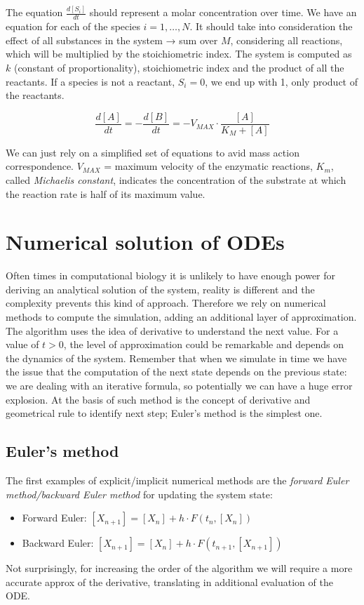 \noindent
The equation $\frac{d[S_i]}{dt}$ should represent a molar concentration over time.
We have an equation for each of the species $i=1,…,N$.
It should take into consideration the effect of all substances in the system → sum over $M$, considering all reactions, which will be multiplied by the stoichiometric index.
The system is computed as $k$ (constant of proportionality), stoichiometric index and the product of all the reactants.
If a species is not a reactant, $S_i=0$, we end up with 1, only product of the reactants.

$$\frac{d[A]}{dt}= - \frac{d[B]}{dt}= -V_{MAX}\cdot \frac{[A]}{K_M+[A]}$$

\noindent
We can just rely on a simplified set of equations to avid mass action correspondence.
$V_{MAX}$ = maximum velocity of the enzymatic reactions, $K_m$, called \emph{Michaelis constant}, indicates the concentration of the substrate at which the reaction rate is half of its maximum value.

\section{Numerical solution of ODEs}
Often times in computational biology it is unlikely to have enough power for deriving an analytical solution of the system, reality is different and the complexity prevents this kind of approach.
Therefore we rely on numerical methods to compute the simulation, adding an additional layer of approximation.
The algorithm uses the idea of derivative to understand the next value.
For a value of $t>0$, the level of approximation could be remarkable and depends on the dynamics of the system.
Remember that when we simulate in time we have the issue that the computation of the next state depends on the previous state: we are dealing with an iterative formula, so potentially we can have a huge error explosion.
At the basis of such method is the concept of derivative and geometrical rule to identify next step; Euler's method is the simplest one.

  \subsection{Euler's method}
  The first examples of explicit/implicit numerical methods are the \emph{forward Euler method/backward Euler method} for updating the system state:

  \begin{itemize}
    \item Forward Euler: $[X_{n+1}] = [X_n]+h·F(t_n,[X_n])$
    \item Backward Euler: $[X_{n+1}] = [X_n]+h·F(t_{n+1},[X_{n+1}])$
  \end{itemize}
\noindent
  Not surprisingly, for increasing the order of the algorithm we will require a more accurate approx of the derivative, translating in additional evaluation of the ODE.

